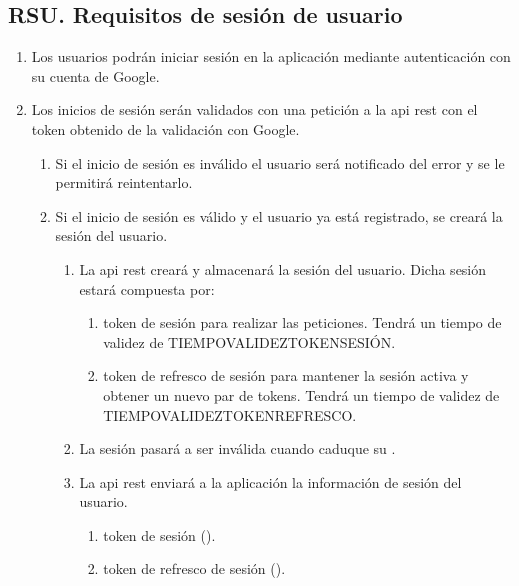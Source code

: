 \subsection{RSU. Requisitos de sesión de usuario}

\begin{enumerate}[label*=RSU \arabic*.]
    \item Los usuarios podrán iniciar sesión en la aplicación mediante autenticación con su cuenta de Google.
    \item Los inicios de sesión serán validados con una petición a la \acrshort{api} \acrshort{rest} con el \gls{token} obtenido de la validación con Google.
    \begin{enumerate}[label*=\arabic*.]
        \item Si el inicio de sesión es inválido el usuario será notificado del error y se le permitirá reintentarlo.
        \item \label{req:inicio_sesion} Si el inicio de sesión es válido y el usuario ya está registrado, se creará la sesión del usuario.
        \begin{enumerate}[label*=\arabic*.]
            \item \label{req:sesion} La \acrshort{api} \acrshort{rest} creará y almacenará la sesión del usuario. Dicha sesión estará compuesta por:
            \begin{enumerate}[label*=\arabic*.]
                \item \label{req:token_sesion}  \Gls{token} de sesión para realizar las peticiones. Tendrá un tiempo de validez de TIEMPO\textunderscore VALIDEZ\textunderscore TOKEN\textunderscore SESIÓN.
                \item \label{req:token_refresco} \Gls{token} de refresco de sesión para mantener la sesión activa y obtener un nuevo par de \glspl{token}. Tendrá un tiempo de validez de TIEMPO\textunderscore VALIDEZ\textunderscore TOKEN\textunderscore REFRESCO.
            \end{enumerate}
            \item La sesión pasará a ser inválida cuando caduque su .
            \item \label{req:info_sesion} La \acrshort{api} \acrshort{rest} enviará a la aplicación la información de sesión del usuario.
            \begin{enumerate}[label*=\arabic*.]
                \item \Gls{token} de sesión ().
                \item \Gls{token} de refresco de sesión ().

\end{enumerate}
\end{enumerate}
\end{enumerate}
\end{enumerate}
